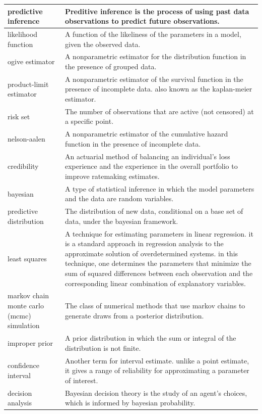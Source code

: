 \documentclass[
]{book}
\begin{document}
\begin{longtable}{>{\raggedright\arraybackslash}p{10em}|>{\raggedright\arraybackslash}p{30em}}
\hline
predictive inference & Preditive inference is the process of using past data observations to predict future observations.\\
\hline
likelihood function & A function of the likeliness of the parameters in a model, given the observed data.\\
\hline
ogive estimator & A nonparametric estimator for the distribution function in the presence of grouped data.\\
\hline
product-limit estimator & A nonparametric estimator of the survival function in the presence of incomplete data. also known as the kaplan-meier estimator.\\
\hline
risk set & The number of observations that are active (not censored) at a specific point.\\
\hline
nelson-aalen & A nonparametric estimator of the cumulative hazard function in the presence of incomplete data.\\
\hline
credibility & An actuarial method of balancing an individual's loss experience and the experience in the overall portfolio to improve ratemaking estimates.\\
\hline
bayesian & A type of statistical inference in which the model parameters and the data are random variables.\\
\hline
predictive distribution & The distribution of new data, conditional on a base set of data, under the bayesian framework.\\
\hline
least squares & A technique for estimating parameters in linear regression. it is a standard approach in regression analysis to the approximate solution of overdetermined systems. in this technique, one determines the parameters that minimize the sum of squared differences between each observation and the corresponding linear combination of explanatory variables.\\
\hline
markov chain monte carlo (mcmc) simulation & The class of numerical methods that use markov chains to generate draws from a posterior distribution.\\
\hline
improper prior & A prior distribution in which the sum or integral of the distribution is not finite.\\
\hline
confidence interval & Another term for interval estimate. unlike a point estimate, it gives a range of reliability for approximating a parameter of interest.\\
\hline
decision analysis & Bayesian decision theory is the study of an agent's choices, which is informed by bayesian probability.\\

\end{longtable}
\end{document}
